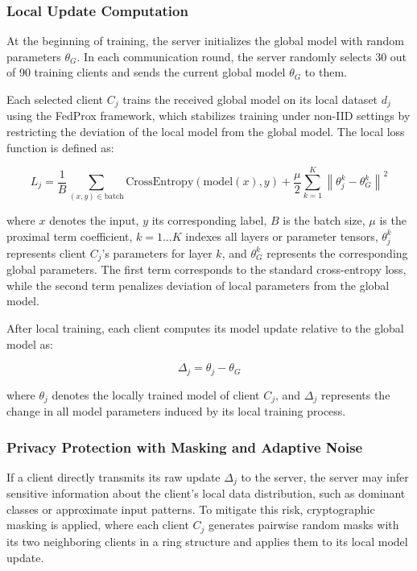 \documentclass[a4paper,fleqn]{cas-dc}
\begin{document}
\subsubsection{Local Update Computation}
\label{sec:4.2.3}

At the beginning of training, the server initializes the global model with random parameters $\theta_{G}$. In each communication round, the server randomly selects 30 out of 90 training clients and sends the current global model $\theta_{G}$ to them.

Each selected client $C_{j}$ trains the received global model on its local dataset $d_{j}$ using the FedProx framework, which stabilizes training under non-IID settings by restricting the deviation of the local model from the global model. The local loss function is defined as:

\begin{equation}
L_{j} = \frac{1}{B} \sum_{(x, y) \in \mathrm{batch}}{\mathrm{CrossEntropy}\left( \mathrm{model}(x),y \right)} + \frac{\mu}{2} \sum_{k = 1}^{K}\left\| \theta_{j}^{k} - \theta_{G}^{k} \right\|^{2}
\label{eq:1}
\end{equation}

where $x$ denotes the input, $y$ its corresponding label, $B$ is the batch size, $\mu$ is the proximal term coefficient, $k = 1\ldots K$ indexes all layers or parameter tensors, $\theta_{j}^{k}$ represents client $C_{j}$'s parameters for layer $k$, and $\theta_{G}^{k}$ represents the corresponding global parameters. The first term corresponds to the standard cross-entropy loss, while the second term penalizes deviation of local parameters from the global model.

After local training, each client computes its model update relative to the global model as:

\begin{equation}
\Delta_{j} = \theta_{j} - \theta_{G}
\label{eq:2}
\end{equation}

where $\theta_{j}$ denotes the locally trained model of client $C_{j}$, and $\Delta_{j}$ represents the change in all model parameters induced by its local training process.

\subsubsection{Privacy Protection with Masking and Adaptive Noise}
\label{sec:4.2.4}

If a client directly transmits its raw update $\Delta_{j}$ to the server, the server may infer sensitive information about the client's local data distribution, such as dominant classes or approximate input patterns. To mitigate this risk, cryptographic masking is applied, where each client $C_{j}$ generates pairwise random masks with its two neighboring clients in a ring structure and applies them to its local model update.
\end{document}
